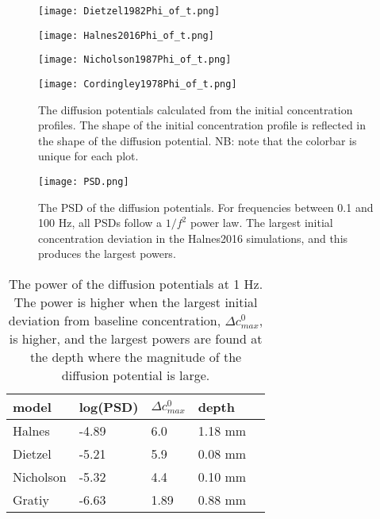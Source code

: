 \documentclass{article}
\begin{document}
\begin{figure}[!tbp]
  \centering
  \begin{minipage}[b]{0.45\textwidth}
    \texttt{[image: Dietzel1982Phi\_of\_t.png]}
  \end{minipage}
  \hfill
  \begin{minipage}[b]{0.45\textwidth}
    \texttt{[image: Halnes2016Phi\_of\_t.png]}
  \end{minipage}
    \begin{minipage}[b]{0.45\textwidth}
    \texttt{[image: Nicholson1987Phi\_of\_t.png]}
  \end{minipage}
  \hfill
  \begin{minipage}[b]{0.45\textwidth}
    \texttt{[image: Cordingley1978Phi\_of\_t.png]}
  \end{minipage}
  \caption{The diffusion potentials calculated from the initial concentration profiles. The shape of the initial concentration profile is reflected in the shape of the diffusion potential. NB: note that the colorbar is unique for each plot.}
  \label{fig:contours}
\end{figure} 




\begin{figure}
  \texttt{[image: PSD.png]}
  \caption{The PSD of the diffusion potentials. For frequencies between 0.1 and 100 Hz, all PSDs follow a $1/f^2$ power law. The largest initial concentration deviation in the Halnes2016 simulations, and this produces the largest powers.}
  \label{fig:PSD}
\end{figure}




\begin{table}[h!]
  \centering
  \caption{The power of the diffusion potentials at 1 Hz. The power is higher when the largest initial deviation from baseline concentration, $\Delta c^0_{max}$, is higher, and the largest powers are found at the depth where the magnitude of the diffusion potential is large.}
  \label{tab:psd_magnitude}
  \begin{tabular}{l||l|l|l|l}
model & log(PSD) & $\Delta c^0_{max}$ & depth \\
\hline
Halnes & -4.89 & 6.0  & 1.18 mm\\
Dietzel & -5.21 & 5.9 & 0.08 mm \\
Nicholson & -5.32 & 4.4 & 0.10 mm \\
Gratiy &-6.63 & 1.89 & 0.88 mm \\
 \end{tabular}
\end{table}
\end{document}
